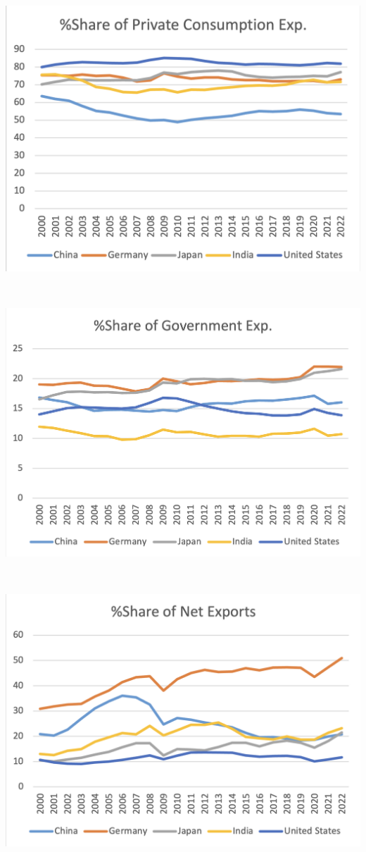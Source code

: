 \documentclass[a4paper,12pt]{extarticle} %
\begin{document}
\begin{center}
    \includegraphics[width=1\textwidth]{Q3/1.png} 
\end{center}\\

\begin{center}
    \includegraphics[width=1\textwidth]{Q3/2.png} 
\end{center}\\
\begin{center}
    \includegraphics[width=1\textwidth]{Q3/3.png} 
\end{center}\\
\end{document}

